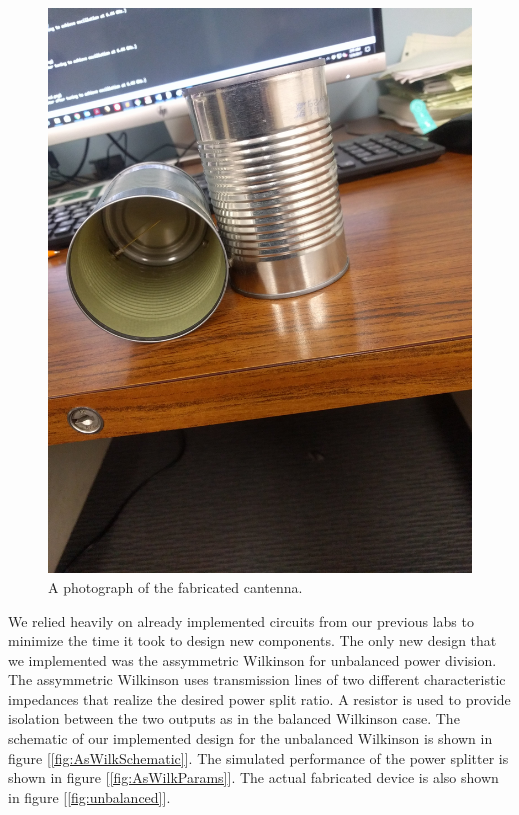 \documentclass[reprint, aps, prl]{revtex4-1}
\begin{document}
\begin{figure}[!htbp]
    \centering
    \includegraphics[scale=0.05]{Photos/cantenna.jpg}
    \caption{A photograph of the fabricated cantenna.}
    \label{fig:cantenna}
\end{figure}

We relied heavily on already implemented circuits from our previous labs to minimize the time it took to design new components. The only new design that we implemented was the assymmetric Wilkinson for unbalanced power division. The assymmetric Wilkinson uses transmission lines of two different characteristic impedances that realize the desired power split ratio. A resistor is used to provide isolation between the two outputs as in the balanced Wilkinson case. The schematic of our implemented design for the unbalanced Wilkinson is shown in figure 
[\ref{fig:AsWilkSchematic}]. The simulated performance of the power splitter is shown in figure [\ref{fig:AsWilkParams}]. The actual fabricated device is also shown in figure [\ref{fig:unbalanced}].
\end{document}
